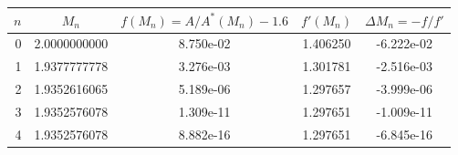 \begin{tabular}{rcccc}
\toprule
$n$ & $M_n$ & $f(M_n)=A/A^*(M_n)-1.6$ & $f'(M_n)$ & $\Delta M_n=-f/f'$ \\
\midrule
0 & 2.0000000000 & 8.750e-02 & 1.406250 & -6.222e-02 \\
1 & 1.9377777778 & 3.276e-03 & 1.301781 & -2.516e-03 \\
2 & 1.9352616065 & 5.189e-06 & 1.297657 & -3.999e-06 \\
3 & 1.9352576078 & 1.309e-11 & 1.297651 & -1.009e-11 \\
4 & 1.9352576078 & 8.882e-16 & 1.297651 & -6.845e-16 \\
\bottomrule
\end{tabular}